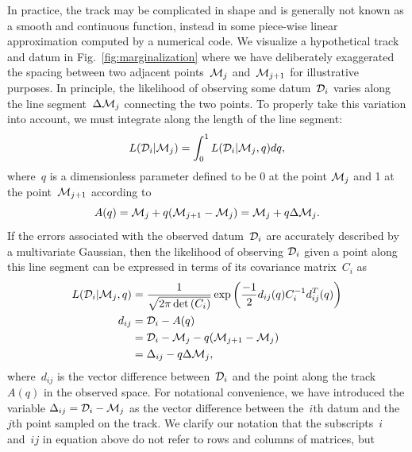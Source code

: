 \documentclass[ms.tex]{subfiles}
\begin{document}
In practice, the track may be complicated in shape and is generally not known
as a smooth and continuous function, instead in some piece-wise linear
approximation computed by a numerical code.
We visualize a hypothetical track and datum in Fig.~\ref{fig:marginalization}
where we have deliberately exaggerated the spacing between two adjacent
points~$\mathcal{M}_j$ and~$\mathcal{M}_{j + 1}$ for illustrative purposes.
In principle, the likelihood of observing some datum~$\mathcal{D}_i$ varies
along the line segment~$\Delta\mathcal{M}_j$ connecting the two points.
To properly take this variation into account, we must integrate along the
length of the line segment:
\begin{equation}
L(\mathcal{D}_i | \mathcal{M}_j) = \int_0^1 L(\mathcal{D}_i | \mathcal{M}_j, q) dq,
\label{eq:l_int_q}
\end{equation}
where~$q$ is a dimensionless parameter defined to be 0 at the point
$\mathcal{M}_j$ and 1 at the point~$\mathcal{M}_{j + 1}$ according to
\begin{equation}
A(q) = \mathcal{M}_j + q(\mathcal{M}_{j + 1} - \mathcal{M}_j)
= \mathcal{M}_j + q\Delta\mathcal{M}_j.
\end{equation}
If the errors associated with the observed datum~$\mathcal{D}_i$ are accurately
described by a multivariate Gaussian, then the likelihood of observing
$\mathcal{D}_i$ given a point along this line segment can be expressed in terms
of its covariance matrix~$C_i$ as
\begin{subequations}\begin{align}
L(\mathcal{D}_i | \mathcal{M}_j, q) &=
\frac{1}{\sqrt{2\pi \det{(C_i)}}}
\exp\left(\frac{-1}{2} d_{ij}(q) C_i^{-1} d_{ij}^T(q)\right)
\label{eq:l_di_mj_q}
\\
d_{ij} &= \mathcal{D}_i - A(q)
\\
&= \mathcal{D}_i - \mathcal{M}_j - q(\mathcal{M}_{j + 1} - \mathcal{M}_j)
\\
&= \Delta_{ij} - q\Delta \mathcal{M}_j,
\label{eq:delta_minus_qmj}
\end{align}\end{subequations}
where~$d_{ij}$ is the vector difference between~$\mathcal{D}_i$ and the
point along the track~$A(q)$ in the observed space.
For notational convenience, we have introduced the variable
$\Delta_{ij} = \mathcal{D}_i - \mathcal{M}_j$ as the vector difference between
the~$i$th datum and the~$j$th point sampled on the track.
We clarify our notation that the subscripts~$i$ and~$ij$ in equation
 above do not refer to rows and columns of matrices, but
\end{document}

